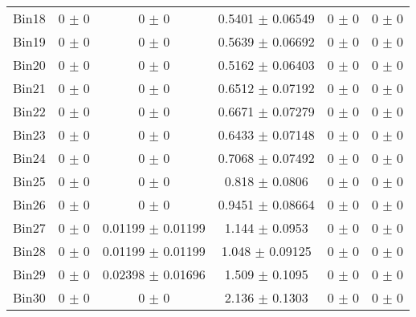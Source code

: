 \begin{tabular}{@{\extracolsep{4pt}}lccccc@{}}
     Bin18 & 0 $\pm$ 0 & 0 $\pm$ 0 & 0.5401 $\pm$ 0.06549 & 0 $\pm$ 0 & 0 $\pm$ 0 \\ 
     Bin19 & 0 $\pm$ 0 & 0 $\pm$ 0 & 0.5639 $\pm$ 0.06692 & 0 $\pm$ 0 & 0 $\pm$ 0 \\ 
     Bin20 & 0 $\pm$ 0 & 0 $\pm$ 0 & 0.5162 $\pm$ 0.06403 & 0 $\pm$ 0 & 0 $\pm$ 0 \\ 
     Bin21 & 0 $\pm$ 0 & 0 $\pm$ 0 & 0.6512 $\pm$ 0.07192 & 0 $\pm$ 0 & 0 $\pm$ 0 \\ 
     Bin22 & 0 $\pm$ 0 & 0 $\pm$ 0 & 0.6671 $\pm$ 0.07279 & 0 $\pm$ 0 & 0 $\pm$ 0 \\ 
     Bin23 & 0 $\pm$ 0 & 0 $\pm$ 0 & 0.6433 $\pm$ 0.07148 & 0 $\pm$ 0 & 0 $\pm$ 0 \\ 
     Bin24 & 0 $\pm$ 0 & 0 $\pm$ 0 & 0.7068 $\pm$ 0.07492 & 0 $\pm$ 0 & 0 $\pm$ 0 \\ 
     Bin25 & 0 $\pm$ 0 & 0 $\pm$ 0 & 0.818 $\pm$ 0.0806 & 0 $\pm$ 0 & 0 $\pm$ 0 \\ 
     Bin26 & 0 $\pm$ 0 & 0 $\pm$ 0 & 0.9451 $\pm$ 0.08664 & 0 $\pm$ 0 & 0 $\pm$ 0 \\ 
     Bin27 & 0 $\pm$ 0 & 0.01199 $\pm$ 0.01199 & 1.144 $\pm$ 0.0953 & 0 $\pm$ 0 & 0 $\pm$ 0 \\ 
     Bin28 & 0 $\pm$ 0 & 0.01199 $\pm$ 0.01199 & 1.048 $\pm$ 0.09125 & 0 $\pm$ 0 & 0 $\pm$ 0 \\ 
     Bin29 & 0 $\pm$ 0 & 0.02398 $\pm$ 0.01696 & 1.509 $\pm$ 0.1095 & 0 $\pm$ 0 & 0 $\pm$ 0 \\ 
     Bin30 & 0 $\pm$ 0 & 0 $\pm$ 0 & 2.136 $\pm$ 0.1303 & 0 $\pm$ 0 & 0 $\pm$ 0 \\ 
\hline\hline
  \end{tabular}
